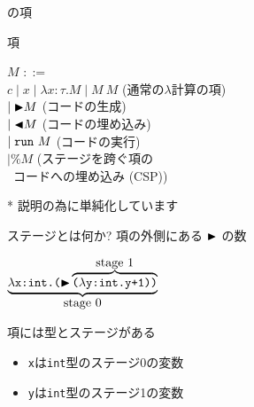 \documentclass[dvipdfmx,aspectratio=169, 20pt]{beamer}
\begin{document}
\begin{frame}[fragile]{\LMD の項}
    \begin{block}{項}
        \begin{tabbing}
            \hspace{2mm} \( M \) \= \( ::= \) \hspace{50mm} \= \\
            \> \( c \mid x \mid \lambda x:\tau.M \mid M\ M \) \> (通常の$\lambda$計算の項) \\
            \> \( \mid {\mathop{\blacktriangleright}} M \) \> (コードの生成) \\
            \> \( \mid {\mathop{\blacktriangleleft}} M \) \> (コードの埋め込み) \\
            \> \( \mid \verb|run|\ M \) \> (コードの実行) \\
            \> \( \mid \% M \) \> (ステージを跨ぐ項の \\
            \> \> \ コードへの埋め込み (CSP))
        \end{tabbing}
    \end{block}
    * 説明の為に単純化しています
\end{frame}

\begin{frame}[fragile]{ステージとは何か?}
    項の外側にある \( {\mathop{\blacktriangleright}} \) の数
    \begin{exampleblock}{}
        \begin{center}
            \( \underbrace{\lambda \texttt{x:int.(}\TB\overbrace{{\texttt{(}}\lambda \texttt{y:int.y+1))}}^{\let\scriptstyle\textstyle\substack{\text{stage }1}}}_{\let\scriptstyle\textstyle\substack{\text{stage }0}} \)
        \end{center}
    \end{exampleblock}
    項には型とステージがある
    \begin{itemize}
        \item {\tt x}は{\tt int}型のステージ0の変数
        \item {\tt y}は{\tt int}型のステージ1の変数
    \end{itemize}
\end{frame}
\end{document}
